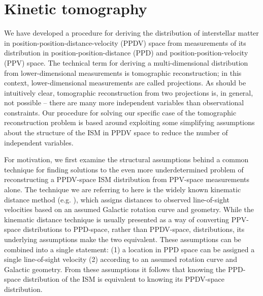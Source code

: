 \section{Kinetic tomography}
\label{sec:KT}
We have developed a procedure for deriving the distribution of interstellar matter in position-position-distance-velocity (PPDV) space from measurements of its distribution in position-position-distance (PPD) and position-position-velocity (PPV) space. 
The technical term for deriving a multi-dimensional distribution from lower-dimensional measurements is tomographic reconstruction; in this context, lower-dimensional measurements are called projections. 
As should be intuitively clear, tomographic reconstruction from two projections is, in general, not possible -- there are many more independent variables than observational constraints. 
Our procedure for solving our specific case of the tomographic reconstruction problem is based around exploiting some simplifying assumptions about the structure of the ISM in PPDV space to reduce the number of independent variables.

For motivation, we first examine the structural assumptions behind a common technique for finding solutions to the even more underdetermined problem of reconstructing a PPDV-space ISM distribution from PPV-space measurements alone. 
The  technique we are referring to here is the widely known kinematic distance method (e.g. \citealt{Levine_2006}), which assigns distances to observed line-of-sight velocities based on an assumed Galactic rotation curve and geometry. 
While the kinematic distance technique is usually presented as a way of converting PPV-space distributions to PPD-space, rather than PPDV-space, distributions, its underlying assumptions make the two equivalent. 
These assumptions can be combined into a single statement: (1) a location in PPD space can be assigned a single line-of-sight velocity (2) according to an assumed rotation curve and Galactic geometry. 
From these assumptions it follows that knowing the PPD-space distribution of the ISM is equivalent to knowing its PPDV-space distribution. 

